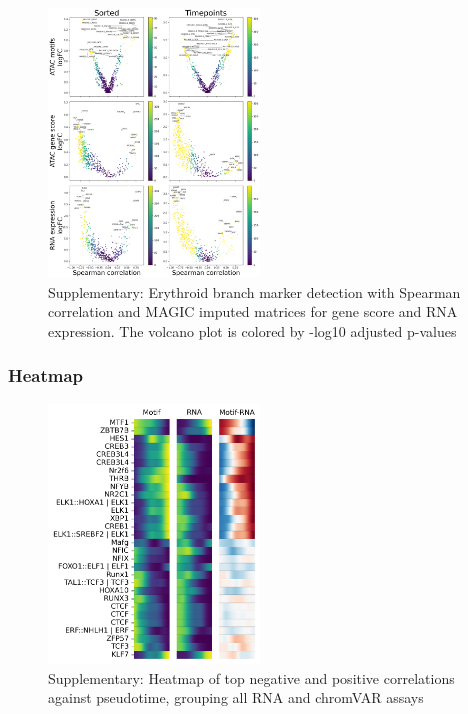 \documentclass[a4paper]{article}
\begin{document}
\begin{figure}[!htb]
  \centering
  \includegraphics[width=0.5\textwidth]{../figures/hematopoiesis/Neutrophil_40_106_smooth_magic_single_branch_volcanos_motifs.png}
  \caption{Supplementary: Erythroid branch marker detection with Spearman correlation and MAGIC imputed matrices for gene score and RNA expression. The volcano plot is colored by -log10 adjusted p-values}
\end{figure}

\FloatBarrier
\subsubsection{Heatmap}

\begin{figure}[!htb]
  \centering
  \includegraphics[width=0.5\textwidth]{../figures/hematopoiesis/Neutrophil_40_106_single_smooth_none_heatmap_grouped_assays.png}
  \caption{Supplementary: Heatmap of top negative and positive correlations against pseudotime, grouping all RNA and chromVAR assays}
\end{figure}
\end{document}
